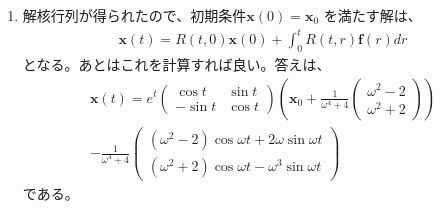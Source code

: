 \documentclass{jsarticle}
\begin{document}
\begin{enumerate}
\item 解核行列が得られたので、初期条件$\boldsymbol{x}(0)=\boldsymbol{x}_{0}$
を満たす解は、
\begin{eqnarray}
\boldsymbol{x}(t)=R(t,0)\boldsymbol{x}(0)
+\int_{0}^{t}R(t,r)\boldsymbol{f}(r)dr
\end{eqnarray}
となる。あとはこれを計算すれば良い。答えは、
\begin{eqnarray}
\boldsymbol{x}(t)=e^{t}\left(
\begin{array}{cc}
\cos t & \sin t\\
-\sin t & \cos t
\end{array}\right)
\left(\boldsymbol{x}_{0}
+\frac{1}{\omega^{4}+4}
\left(\begin{array}{c}
\omega^{2}-2\\
\omega^{2}+2
\end{array}\right)
\right)\\
-\frac{1}{\omega^{4}+4}\left(
\begin{array}{c}
(\omega^{2}-2)\cos\omega t+2\omega\sin\omega t\\
(\omega^{2}+2)\cos\omega t-\omega^{3}\sin\omega t
\end{array}\right)
\end{eqnarray}
である。
\end{enumerate}
\end{document}
